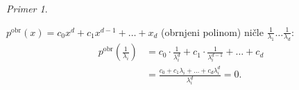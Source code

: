 \documentclass[a4paper, 12pt]{book}
\theoremstyle{definition}
\theoremstyle{remark}
\newtheorem*{ex}{Primer}
\begin{document}
\begin{ex}
\begin{enumerate}[label=(\alph*)]
      $p^{\text{obr}}(x) = c_0 x^d + c_1 x^{d-1} + \dots + x_d$ (obrnjeni polinom) ničle $\frac{1}{\lambda_1} \dots \frac{1}{\lambda_d}$: \\
      \begin{align*}
        p^{\text{obr}}\left(\frac{1}{\lambda_i}\right) &=
          c_0 \cdot \frac{1}{\lambda_i^d} + c_1 \cdot \frac{1}{\lambda_i^{d-1}} + \dots + c_d \\
        &= \frac{c_0 + c_1 \lambda_i + \dots + c_d \lambda_i^d}{\lambda_i^d} = 0.
      \end{align*}
  \end{enumerate}
\end{ex}



%
%



\end{document}
